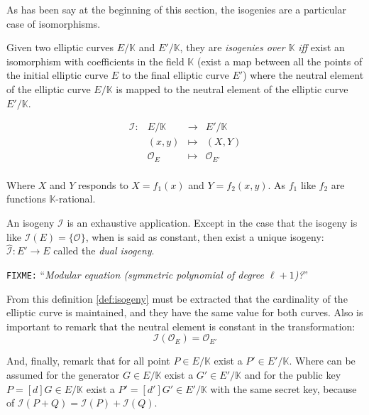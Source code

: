 \documentclass[10pt,a4paper,twoside]{llncs}
\newcommand{\fixme}[1]{\texttt{\color{red}FIXME:} ``\emph{#1}''}
\newcommand{\PaIe}{\ensuremath{\mathcal{O}_{E}}}%
\begin{document}
As has been say at the beginning of this section, the isogenies are a particular case of isomorphisms.

\begin{definition}\label{def:isogeny}
 Given two elliptic curves $E/\mathbb{K}$ and $E'/\mathbb{K}$, they are \emph{isogenies over $\mathbb{K}$} \emph{iff} exist an isomorphism with coefficients in the field $\mathbb{K}$ (exist a map between all the points of the initial elliptic curve $E$ to the final elliptic curve $E'$) where the neutral element of the elliptic curve $E/\mathbb{K}$ is mapped to the neutral element of the elliptic curve $E'/\mathbb{K}$.

\begin{equation}\label{eq:isogenia}
        \begin{array}{cccc}
                \mathcal{I}: & E/\mathbb{K} & \rightarrow & E'/\mathbb{K} \\
                \;           & (x,y)        & \mapsto     & (X,Y) \\
                \;           & \mathcal{O}_{E} & \mapsto  & \mathcal{O}_{E'} \\
        \end{array}
\end{equation}

Where $X$ and $Y$ responds to $X=f_{1}(x)$ and $Y=f_{2}(x,y)$. As $f_{1}$ like $f_{2}$ are functions $\mathbb{K}$-rational.
\end{definition}

An isogeny $\mathcal{I}$ is an exhaustive application. Except in the case that the isogeny is like $\mathcal{I}(E)=\{\mathcal{O}\}$, when is said as constant, then exist a unique isogeny: $\widehat{\mathcal{I}}:E' \rightarrow E$ called the \emph{dual isogeny}.

\fixme{Modular equation (symmetric polynomial of degree $\ell+1$)?}

From this definition \ref{def:isogeny} must be extracted that the cardinality of the elliptic curve is maintained, and they have the same value for both curves. Also is important to remark that the neutral element is constant in the transformation:
 \begin{equation}\label{eq:isoPaI}
        \mathcal{I}\left(\PaIe\right) = \mathcal{O}_{E'}
\end{equation}

And, finally, remark that for all point $P \in E/\mathbb{K}$ exist a $P' \in E'/\mathbb{K}$. Where can be assumed for the generator $G \in E/\mathbb{K}$ exist a $G' \in E'/\mathbb{K}$ and for the public key $P=[d]G \in E/\mathbb{K}$ exist a $P'=[d']G' \in E'/\mathbb{K}$ with the same secret key, because of $\mathcal{I}\left(P+Q\right) = \mathcal{I}\left(P\right)+\mathcal{I}\left(Q\right)$.
\end{document}
